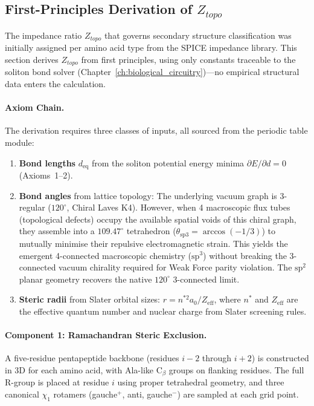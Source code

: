 \subsection{First-Principles Derivation of $Z_{topo}$}
\label{sec:ramachandran_derivation}

The impedance ratio $Z_{topo}$ that governs secondary structure classification was initially assigned per amino acid type from the SPICE impedance library.  This section derives $Z_{topo}$ from first principles, using only constants traceable to the soliton bond solver (Chapter~\ref{ch:biological_circuitry})---no empirical structural data enters the calculation.

\paragraph{Axiom Chain.}
The derivation requires three classes of inputs, all sourced from the periodic table module:
\begin{enumerate}
    \item \textbf{Bond lengths} $d_\text{eq}$ from the soliton potential energy minima $\partial E/\partial d = 0$ (Axioms~1--2).
    \item \textbf{Bond angles} from lattice topology: The underlying vacuum graph is 3-regular ($120^\circ$, Chiral Laves K4). However, when 4 macroscopic flux tubes (topological defects) occupy the available spatial voids of this chiral graph, they assemble into a $109.47^\circ$ tetrahedron ($\theta_\text{sp3} = \arccos(-1/3)$) to mutually minimise their repulsive electromagnetic strain. This yields the emergent 4-connected macroscopic chemistry ($\text{sp}^3$) without breaking the 3-connected vacuum chirality required for Weak Force parity violation. The $\text{sp}^2$ planar geometry recovers the native $120^\circ$ 3-connected limit.
    \item \textbf{Steric radii} from Slater orbital sizes: $r = n^{*2} a_0 / Z_\text{eff}$, where $n^*$ and $Z_\text{eff}$ are the effective quantum number and nuclear charge from Slater screening rules.
\end{enumerate}

\paragraph{Component 1: Ramachandran Steric Exclusion.}
A five-residue pentapeptide backbone (residues $i{-}2$ through $i{+}2$) is constructed in 3D for each amino acid, with Ala-like C$_\beta$ groups on flanking residues.  The full R-group is placed at residue $i$ using proper tetrahedral geometry, and three canonical $\chi_1$ rotamers (gauche$^+$, anti, gauche$^-$) are sampled at each grid point.

